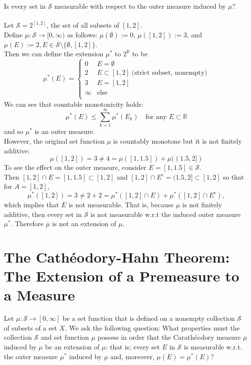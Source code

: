\begin{enumerate}
	Is every set in $\mathcal{S}$ measurable with respect to the outer measure induced by $\mu$?\\
	\\Let $\mathcal{S}=2^{[1,2]}$, the set of all subsets of $[1,2]$.
	\\Define $\mu:\mathcal{S}\to[0,\infty)$ as follows: $\mu(\emptyset):=0$, $\mu([1,2]):=3$, and $\mu(E):=2,E\in\mathcal{S}\setminus\{\emptyset,[1,2]\}$. 
	\\Then we can define the extension $\mu^*$ to $2^{\mathbb{R}}$ to be
	\[
		\mu^*(E)=
		\begin{cases}
			0&E=\emptyset\\
			2&E\subset[1,2]\ \text{(strict subset, nonempty)}\\
			3&E=[1,2]\\
			\infty&\text{else}\\
		\end{cases}
	\]
	We can see that countable monotonicity holds:
	\[
		\mu^*(E)\le\sum_{k=1}^\infty\mu^*(E_k)\quad\text{for any }E\subset\mathbb{R}
	\]
	and so $\mu^*$ is an outer measure.
	\\However, the original set function $\mu$ is countably monotone but it is not finitely additive:
	\[
		\mu([1,2])=3\neq 4=\mu([1,1.5])+\mu((1.5,2])
	\]
	To see the effect on the outer measure, consider $E=[1,1.5]\in\mathcal{S}$.
	\\Then $[1,2]\cap E=[1,1.5]\subset[1,2]$ and $[1,2]\cap E^c=(1.5,2]\subset[1,2]$ so that for $A=[1,2]$,
	\[
		\mu^*([1,2])=3\neq2+2=\mu^*([1,2]\cap E)+\mu^*([1,2]\cap E^c),
	\]
	which implies that $E$ is not measurable.
	That is, because $\mu$ is not finitely additive, then every set in $\mathcal{S}$ is not measurable w.r.t the induced outer measure $\mu^*$.
	Therefore $\overline{\mu}$ is not an extension of $\mu$.
\end{enumerate}

\section{The Cath\'eodory-Hahn Theorem: The Extension of a Premeasure to a Measure}
Let $\mu:\mathcal{S}\to[0,\infty]$ be a set function that is defined on a nonempty collection $\mathcal{S}$ of subsets of a set $X$.
We ask the following question:
What properties must the collection $\mathcal{S}$ and set function $\mu$ possess in order that the Carath\'eodory measure $\overline{\mu}$ induced by $\mu$ be an extension of $\mu$:
that is; every set $E$ in $\mathcal{S}$ is measurable w.r.t. the outer measure $\mu^*$ induced by $\mu$ and, moreover, $\mu(E)=\mu^*(E)$?

